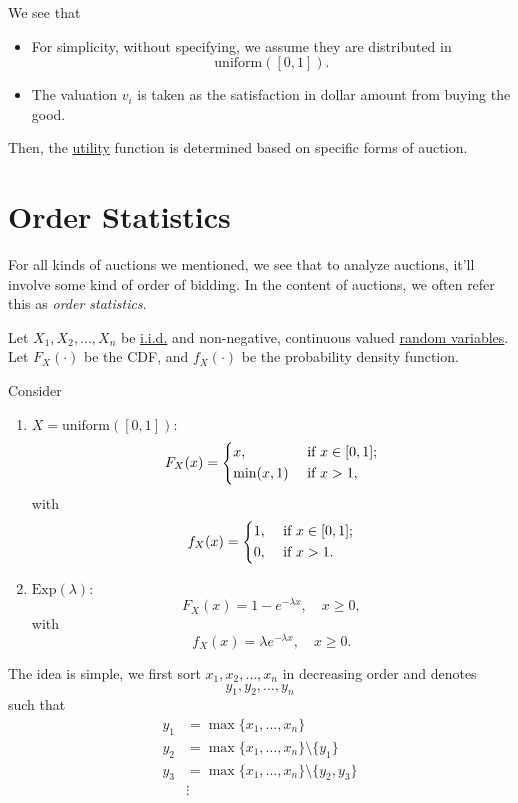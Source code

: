 \begin{note}
	We see that
	\begin{itemize}
		\item For simplicity, without specifying, we assume they are distributed in
		      \[
			      \mathrm{uniform} ([0, 1]).
		      \]
		\item The valuation \(v_{i}\) is taken as the satisfaction in dollar amount from buying the good.
	\end{itemize}
\end{note}

Then, the \hyperref[def:reward]{utility} function is determined based on specific forms of auction.

\section{Order Statistics}
For all kinds of auctions we mentioned, we see that to analyze auctions, it'll involve some kind of order of bidding. In the content of auctions, we often refer this as \emph{order statistics}.

Let \(X_1, X_2, \dots , X_n\) be \hyperref[def:i.i.d.]{i.i.d.} and non-negative, continuous valued \hyperref[def:random-variable]{random variables}. Let \(F_{X}(\cdot)\) be the CDF, and \(f_{X}(\cdot)\) be the probability density function.
\begin{eg}
	Consider
	\begin{enumerate}
		\item \(X = \mathrm{uniform}([0, 1])\):
		      \[
			      F_X(x) = \begin{dcases}
				      x,         & \text{ if } x\in[0, 1]; \\
				      \min(x, 1) & \text{ if }x>1,         \\
			      \end{dcases}
		      \]
		      with
		      \[
			      f_X(x) = \begin{dcases}
				      1, & \text{ if } x\in[0, 1]; \\
				      0, & \text{ if }x>1.
			      \end{dcases}
		      \]
		\item \(\mathrm{Exp}(\lambda)\):
		      \[
			      F_X(x) = 1 - e^{-\lambda x}, \quad x\geq 0,
		      \]
		      with
		      \[
			      f_X(x) = \lambda e^{-\lambda x},\quad x\geq 0.
		      \]
	\end{enumerate}
\end{eg}

The idea is simple, we first sort \(x_1, x_2, \dots , x_n\) in decreasing order and denotes
\[
	y_1, y_2, \dots , y_{n}
\]
such that
\[
	\begin{split}
		y_1 &= \max\{x_1, \dots , x_n\}\\
		y_2 &= \max\{x_1, \dots , x_n\}\setminus \{y_1\}\\
		y_3 &= \max\{x_1, \dots , x_n\}\setminus \{y_2, y_3\}\\
		&\vdots
	\end{split}
\]

